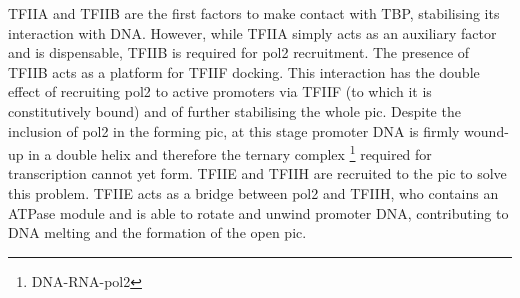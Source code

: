 TFIIA and TFIIB are the first factors to make contact with TBP, stabilising its interaction with DNA.
However, while TFIIA simply acts as an auxiliary factor and is dispensable, TFIIB is required for \gls{pol2} recruitment.
The presence of TFIIB acts as a platform for TFIIF docking. 
This interaction has the double effect of recruiting \gls{pol2} to active promoters via TFIIF (to which it is constitutively bound) and of further stabilising the whole \gls{pic}. 
Despite the inclusion of \gls{pol2} in the forming \gls{pic}, at this stage promoter DNA is firmly wound-up in a double helix and therefore the ternary complex \footnote{DNA-RNA-\gls{pol2}} required for transcription cannot yet form.
TFIIE and TFIIH are recruited to the \gls{pic} to solve this problem.
TFIIE acts as a bridge between \gls{pol2} and TFIIH, who contains an ATPase module and is able to  rotate and unwind promoter DNA, contributing to DNA melting and the formation of the open \gls{pic}.










